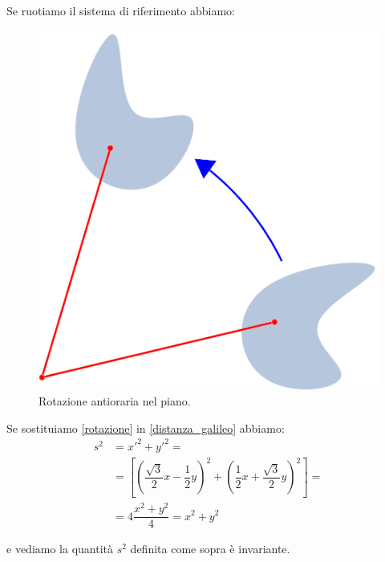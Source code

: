 Se ruotiamo il sistema di riferimento abbiamo:
\begin{figure}[htbp]
  \centering
  \includegraphics[scale=0.05]{immagini/galileo/Rotation_illustration}
  \caption{Rotazione antioraria nel piano.}
\end{figure}

Se sostituiamo \ref{rotazione} in \ref{distanza_galileo} abbiamo:
\begin{equation}
\begin{split}
s^2 &= {x'}^2 + {y'}^2 = \\
&= \left[\left(\dfrac{\sqrt{3}}{2}x-\dfrac{1}{2}y\right)^2 + \left(\dfrac{1}{2}x+\dfrac{\sqrt{3}}{2}y\right)^2\right] =\\
&= 4\dfrac{x^2 + y^2}{4} = x^2 +y^2
\end{split}
\end{equation}

e vediamo la quantità $s^2$ definita come sopra è invariante.
